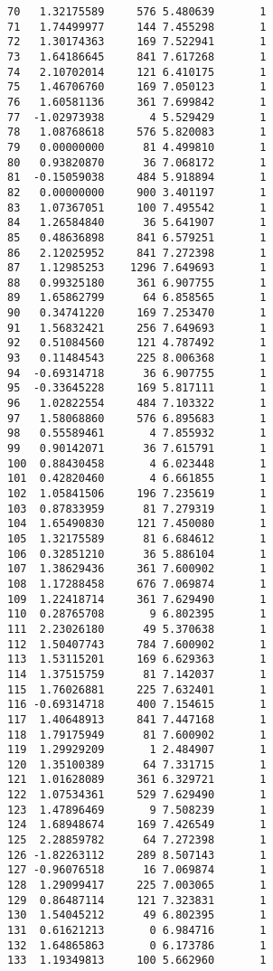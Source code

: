 \documentclass[
  letterpaper,
  DIV=11,
  numbers=noendperiod]{scrreprt}
\begin{document}
\begin{verbatim}
70   1.32175589     576 5.480639       1
71   1.74499977     144 7.455298       1
72   1.30174363     169 7.522941       1
73   1.64186645     841 7.617268       1
74   2.10702014     121 6.410175       1
75   1.46706760     169 7.050123       1
76   1.60581136     361 7.699842       1
77  -1.02973938       4 5.529429       1
78   1.08768618     576 5.820083       1
79   0.00000000      81 4.499810       1
80   0.93820870      36 7.068172       1
81  -0.15059038     484 5.918894       1
82   0.00000000     900 3.401197       1
83   1.07367051     100 7.495542       1
84   1.26584840      36 5.641907       1
85   0.48636898     841 6.579251       1
86   2.12025952     841 7.272398       1
87   1.12985253    1296 7.649693       1
88   0.99325180     361 6.907755       1
89   1.65862799      64 6.858565       1
90   0.34741220     169 7.253470       1
91   1.56832421     256 7.649693       1
92   0.51084560     121 4.787492       1
93   0.11484543     225 8.006368       1
94  -0.69314718      36 6.907755       1
95  -0.33645228     169 5.817111       1
96   1.02822554     484 7.103322       1
97   1.58068860     576 6.895683       1
98   0.55589461       4 7.855932       1
99   0.90142071      36 7.615791       1
100  0.88430458       4 6.023448       1
101  0.42820460       4 6.661855       1
102  1.05841506     196 7.235619       1
103  0.87833959      81 7.279319       1
104  1.65490830     121 7.450080       1
105  1.32175589      81 6.684612       1
106  0.32851210      36 5.886104       1
107  1.38629436     361 7.600902       1
108  1.17288458     676 7.069874       1
109  1.22418714     361 7.629490       1
110  0.28765708       9 6.802395       1
111  2.23026180      49 5.370638       1
112  1.50407743     784 7.600902       1
113  1.53115201     169 6.629363       1
114  1.37515759      81 7.142037       1
115  1.76026881     225 7.632401       1
116 -0.69314718     400 7.154615       1
117  1.40648913     841 7.447168       1
118  1.79175949      81 7.600902       1
119  1.29929209       1 2.484907       1
120  1.35100389      64 7.331715       1
121  1.01628089     361 6.329721       1
122  1.07534361     529 7.629490       1
123  1.47896469       9 7.508239       1
124  1.68948674     169 7.426549       1
125  2.28859782      64 7.272398       1
126 -1.82263112     289 8.507143       1
127 -0.96076518      16 7.069874       1
128  1.29099417     225 7.003065       1
129  0.86487114     121 7.323831       1
130  1.54045212      49 6.802395       1
131  0.61621213       0 6.984716       1
132  1.64865863       0 6.173786       1
133  1.19349813     100 5.662960       1

\end{verbatim}
\end{document}
